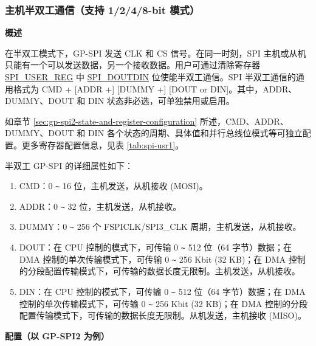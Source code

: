 \documentclass[main\_\_CN.tex]{subfiles}
\begin{document}
\subsubsection{主机半双工通信（支持 1/2/4/8-bit 模式）}
\label{sec:gp-spi2-1/2/8-bits}

\textbf{概述}

在半双工模式下，GP-SPI 发送 CLK 和 CS 信号。在同一时刻，SPI 主机或从机只能有一个可以发送数据，另一个接收数据。用户可通过清除寄存器  \hyperref[regdesc:SPIUSERREG]{SPI\_USER\_REG} 中  \hyperref[fielddesc:SPIDOUTDIN]{SPI\_DOUTDIN} 位使能半双工通信。SPI 半双工通信的通用格式为 CMD + [ADDR +] [DUMMY +] [DOUT or DIN]。其中，ADDR、DUMMY、DOUT 和 DIN 状态非必选，可单独禁用或启用。

如章节  \ref{sec:gp-spi2-state-and-register-configuration} 所述，CMD、ADDR、DUMMY、DOUT 和 DIN 各个状态的周期、具体值和并行总线位模式等可独立配置。更多寄存器配置信息，见表  \ref{tab:spi-usr1}。

半双工 GP-SPI 的详细属性如下：

\begin{enumerate}
    \item CMD：0 \verb+~+ 16 位，主机发送，从机接收 (MOSI)。
    \item ADDR：0 \verb+~+ 32 位，主机发送，从机接收。
    \item DUMMY：0 \verb+~+ 256 个 FSPICLK/SPI3\_CLK 周期，主机发送，从机接收。
    \item DOUT：在 CPU 控制的模式下，可传输 0 \verb+~+ 512 位（64 字节）数据；在 DMA 控制的单次传输模式下，可传输 0 \verb+~+ 256 Kbit (32 KB)；在 DMA 控制的分段配置传输模式下，可传输的数据长度无限制。主机发送，从机接收。

    \item DIN：在 CPU 控制的模式下，可传输 0 \verb+~+ 512 位（64 字节）数据；在 DMA 控制的单次传输模式下，可传输 0 \verb+~+ 256 Kbit (32 KB)；在 DMA 控制的分段配置传输模式下，可传输的数据长度无限制。从机发送，主机接收 (MISO)。
\end{enumerate}

\textbf{配置（以 GP-SPI2 为例）}
\end{document}
